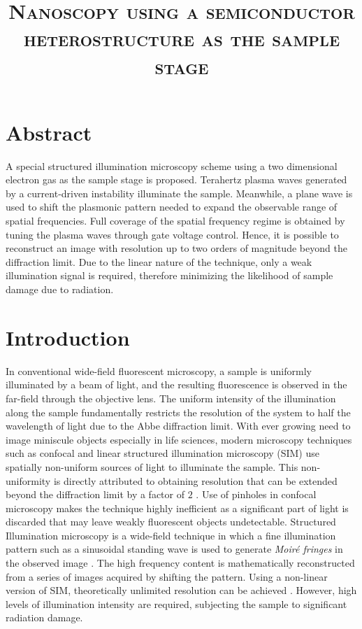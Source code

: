 \documentclass[11pt]{article}
\begin{document}
\title{\textsc{Nanoscopy using a semiconductor heterostructure as the sample stage}}

\maketitle


\section{Abstract}
%
A special structured illumination microscopy scheme using a two dimensional electron gas as the sample stage is proposed. Terahertz plasma waves generated by a current-driven instability illuminate the sample. Meanwhile, a plane wave is used to shift the plasmonic pattern needed to expand the observable range of spatial frequencies. Full coverage of the spatial frequency regime is obtained by tuning the plasma waves through gate voltage control. Hence, it is possible to reconstruct an image with resolution up to two orders of magnitude beyond the diffraction limit. Due to the linear nature of the technique, only a weak illumination signal is required, therefore minimizing the likelihood of sample damage due to radiation.
%
\section{Introduction}
%
In conventional wide-field fluorescent microscopy, a sample is uniformly illuminated by a beam of light, and the resulting fluorescence is observed in the far-field through the objective lens. The uniform intensity of the illumination along the sample fundamentally restricts the resolution of the system to half the wavelength of light due to the Abbe diffraction limit. With ever growing need to image miniscule objects especially in life sciences, modern microscopy techniques such as confocal and linear structured illumination microscopy (SIM) use spatially non-uniform sources of light to illuminate the sample. This non-uniformity is directly attributed to obtaining resolution that can be extended beyond the diffraction limit by a factor of $2$ \cite{Minsky1988,Gustafsson2000}. Use of pinholes in confocal microscopy makes the technique highly inefficient as a significant part of light is discarded that may leave weakly fluorescent objects undetectable. Structured Illumination microscopy is a wide-field technique in which a fine illumination pattern such as a sinusoidal standing wave is used to generate \emph{Moiré fringes} in the
observed image \cite{Heintzmann1999, Heintzmann2006}. The high frequency content is mathematically reconstructed from a series of images acquired by shifting the pattern. Using a non-linear version of SIM, theoretically unlimited resolution can be achieved \cite{Gustafsson_2005}. However, high levels of illumination intensity are required, subjecting the sample to significant radiation damage.
\end{document}
